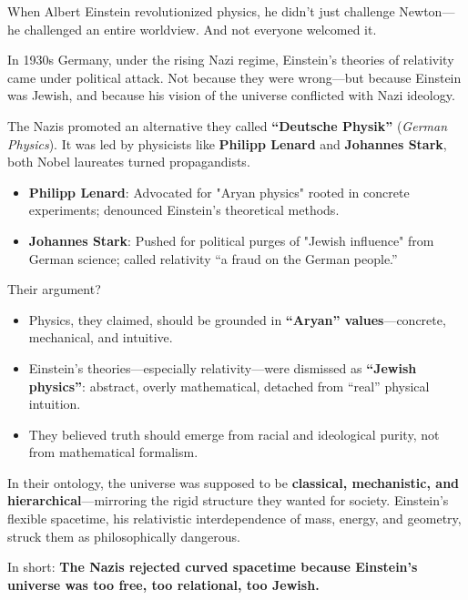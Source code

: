 \begin{tcolorbox}[colback=gray!5!white, colframe=black, title={Historical Sidebar: When Ideology Rejected Reality — Einstein and the Nazi War on Physics}, fonttitle=\bfseries, arc=1.5mm, boxrule=0.4pt]

  When Albert Einstein revolutionized physics, he didn’t just challenge Newton—he challenged an entire worldview.  And not everyone welcomed it.

  \medskip
  
  In 1930s Germany, under the rising Nazi regime, Einstein’s theories of relativity came under political attack. Not because they were wrong—but because Einstein was Jewish, and because his vision of the universe conflicted with Nazi ideology.

  \medskip
  
  The Nazis promoted an alternative they called \textbf{“Deutsche Physik”} (\textit{German Physics}).  It was led by physicists like \textbf{Philipp Lenard} and \textbf{Johannes Stark}, both Nobel laureates turned propagandists.

  \medskip

  \begin{itemize}
      \item \textbf{Philipp Lenard}: Advocated for "Aryan physics" rooted in concrete experiments; denounced Einstein’s theoretical methods.
      \item \textbf{Johannes Stark}: Pushed for political purges of "Jewish influence" from German science; called relativity “a fraud on the German people.”
  \end{itemize}

  \medskip
  
  Their argument?

  \medskip
  
  \begin{itemize}
    \item Physics, they claimed, should be grounded in \textbf{“Aryan” values}—concrete, mechanical, and intuitive.
    \item Einstein’s theories—especially relativity—were dismissed as \textbf{“Jewish physics”}: abstract, overly mathematical, detached from “real” physical intuition.
    \item They believed truth should emerge from racial and ideological purity, not from mathematical formalism.
  \end{itemize}


  \medskip
  
  In their ontology, the universe was supposed to be \textbf{classical, mechanistic, and hierarchical}—mirroring the rigid structure they wanted for society.  Einstein’s flexible spacetime, his relativistic interdependence of mass, energy, and geometry, struck them as philosophically dangerous.

  \medskip
  
  In short:  \textbf{The Nazis rejected curved spacetime because Einstein's universe was too free, too relational, too Jewish.}
  
  
\end{tcolorbox}
